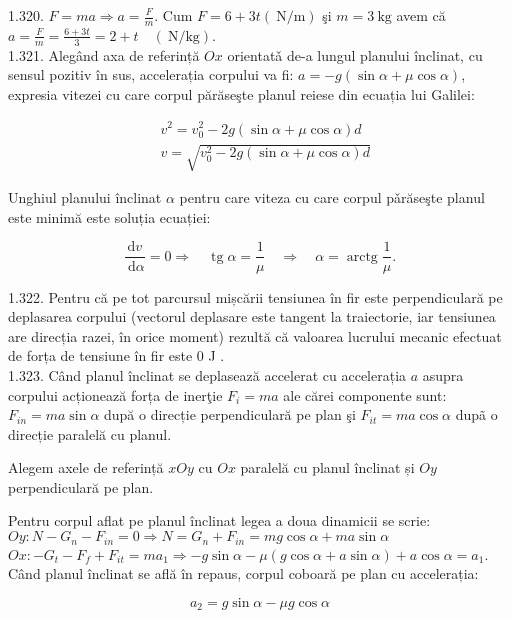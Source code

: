 1.320. $F=m a \Rightarrow a=\frac{F}{m}$. Cum $F=6+3 t(\mathrm{~N} / \mathrm{m})$ şi $m=3 \mathrm{~kg}$ avem că $a=\frac{F}{m}=\frac{6+3 t}{3}=2+t \quad(\mathrm{~N} / \mathrm{kg})$.\\
1.321. Alegând axa de referință $O x$ orientatǎ de-a lungul planului înclinat, cu sensul pozitiv în sus, accelerația corpului va fi: $a=-g(\sin \alpha+\mu \cos \alpha)$, expresia vitezei cu care corpul părăseşte planul reiese din ecuația lui Galilei:

$$
\begin{aligned}
& v^{2}=v_{0}^{2}-2 g(\sin \alpha+\mu \cos \alpha) d \\
& v=\sqrt{v_{0}^{2}-2 g(\sin \alpha+\mu \cos \alpha) d}
\end{aligned}
$$

Unghiul planului înclinat $\alpha$ pentru care viteza cu care corpul pǎrăseşte planul este minimă este soluția ecuației:

$$
\frac{\mathrm{d} v}{\mathrm{~d} \alpha}=0 \Rightarrow \quad \operatorname{tg} \alpha=\frac{1}{\mu} \quad \Rightarrow \quad \alpha=\operatorname{arctg} \frac{1}{\mu} .
$$

1.322. Pentru că pe tot parcursul mișcării tensiunea în fir este perpendiculară pe deplasarea corpului (vectorul deplasare este tangent la traiectorie, iar tensiunea are direcția razei, în orice moment) rezultă că valoarea lucrului mecanic efectuat de forța de tensiune în fir este 0 J .\\
1.323. Când planul înclinat se deplasează accelerat cu accelerația $a$ asupra corpului acționează forța de inerţie $F_{i}=m a$ ale cărei componente sunt: $F_{i n}=m a \sin \alpha$ după o direcție perpendiculară pe plan şi $F_{i t}=m a \cos \alpha$ dupã o direcție paralelă cu planul.

Alegem axele de referință $x O y$ cu $O x$ paralelă cu planul înclinat și $O y$ perpendiculară pe plan.

Pentru corpul aflat pe planul înclinat legea a doua dinamicii se scrie:\\
$O y: N-G_{n}-F_{i n}=0 \Rightarrow N=G_{n}+F_{i n}=m g \cos \alpha+m a \sin \alpha$\\
$O x:-G_{t}-F_{f}+F_{i t}=m a_{1} \Rightarrow-g \sin \alpha-\mu(g \cos \alpha+a \sin \alpha)+a \cos \alpha=a_{1}$.\\
Când planul înclinat se află în repaus, corpul coboară pe plan cu accelerația:

$$
a_{2}=g \sin \alpha-\mu g \cos \alpha
$$

